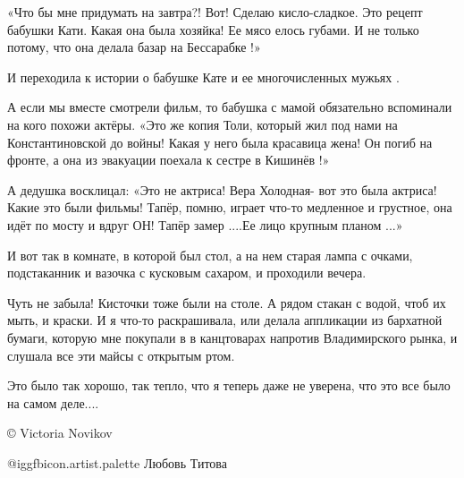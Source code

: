 «Что бы мне придумать на завтра?! Вот! Сделаю кисло-сладкое. Это рецепт бабушки
Кати. Какая она была хозяйка! Ее  мясо елось губами. И не только потому, что
она делала базар на Бессарабке !»

И переходила к  истории о бабушке Кате и  ее многочисленных мужьях .

А если мы вместе смотрели фильм, то бабушка с мамой обязательно вспоминали на
кого похожи актёры. «Это же  копия Толи, который жил под нами на
Константиновской до войны! Какая у него была красавица жена! Он погиб на
фронте, а она из эвакуации поехала к сестре в Кишинёв !» 

А дедушка восклицал: «Это не актриса! Вера Холодная- вот это была актриса!
Какие это были фильмы! Тапёр, помню, играет что-то медленное и грустное, она
идёт по мосту и вдруг ОН! Тапёр замер  ....Ее лицо крупным планом ...»

И вот так в комнате, в которой был стол, а на нем старая лампа с очками,
подстаканник и вазочка с кусковым сахаром, и проходили вечера.

Чуть не забыла! Кисточки тоже были на столе. А рядом стакан с водой, чтоб их
мыть, и краски. И я что-то раскрашивала, или делала аппликации из бархатной
бумаги, которую мне покупали в в канцтоварах напротив Владимирского рынка, и
слушала все эти майсы с открытым ртом. 

Это было  так хорошо, так тепло, что я теперь даже не уверена, что это  все
было на самом деле....

©️ Victoria Novikov

@igg{fbicon.artist.palette} Любовь Титова

